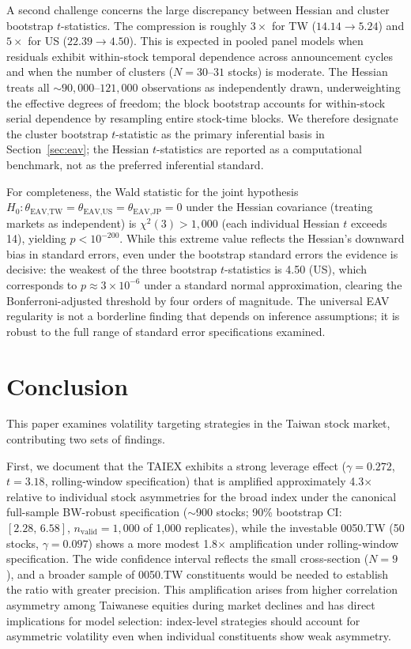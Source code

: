 A second challenge concerns the large discrepancy between Hessian and cluster bootstrap $t$-statistics. The compression is roughly $3\times$ for TW ($14.14 \to 5.24$) and $5\times$ for US ($22.39 \to 4.50$). This is expected in pooled panel models when residuals exhibit within-stock temporal dependence across announcement cycles and when the number of clusters ($N = 30$--$31$ stocks) is moderate. The Hessian treats all $\sim\!90{,}000$--$121{,}000$ observations as independently drawn, underweighting the effective degrees of freedom; the block bootstrap accounts for within-stock serial dependence by resampling entire stock-time blocks. We therefore designate the cluster bootstrap $t$-statistic as the primary inferential basis in Section~\ref{sec:eav}; the Hessian $t$-statistics are reported as a computational benchmark, not as the preferred inferential standard.

For completeness, the Wald statistic for the joint hypothesis $H_0: \theta_{\text{EAV,TW}} = \theta_{\text{EAV,US}} = \theta_{\text{EAV,JP}} = 0$ under the Hessian covariance (treating markets as independent) is $\chi^2(3) > 1{,}000$ (each individual Hessian $t$ exceeds 14), yielding $p < 10^{-200}$. While this extreme value reflects the Hessian's downward bias in standard errors, even under the bootstrap standard errors the evidence is decisive: the weakest of the three bootstrap $t$-statistics is 4.50 (US), which corresponds to $p \approx 3 \times 10^{-6}$ under a standard normal approximation, clearing the Bonferroni-adjusted threshold by four orders of magnitude. The universal EAV regularity is not a borderline finding that depends on inference assumptions; it is robust to the full range of standard error specifications examined.


\section{Conclusion}
\label{sec:conclusion}

This paper examines volatility targeting strategies in the Taiwan stock market, contributing two sets of findings.

First, we document that the TAIEX exhibits a strong leverage effect ($\gamma = 0.272$, $t = 3.18$, rolling-window specification) that is amplified approximately 4.3$\times$ relative to individual stock asymmetries for the broad index under the canonical full-sample BW-robust specification ($\sim$900 stocks; 90\% bootstrap CI: $[2.28, \, 6.58]$, $n_{\text{valid}}=1{,}000$ of 1,000 replicates), while the investable 0050.TW (50 stocks, $\gamma = 0.097$) shows a more modest 1.8$\times$ amplification under rolling-window specification. The wide confidence interval reflects the small cross-section ($N=9$), and a broader sample of 0050.TW constituents would be needed to establish the ratio with greater precision. This amplification arises from higher correlation asymmetry among Taiwanese equities during market declines and has direct implications for model selection: index-level strategies should account for asymmetric volatility even when individual constituents show weak asymmetry.

